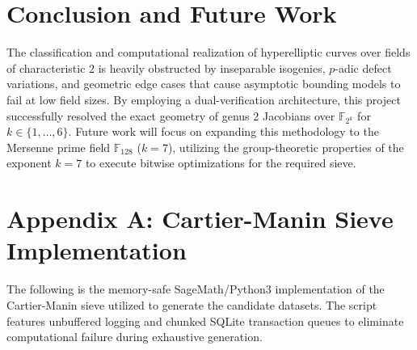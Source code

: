 \documentclass[12pt]{article}
\begin{document}
\section{Conclusion and Future Work}
The classification and computational realization of hyperelliptic curves over fields of characteristic 2 is heavily obstructed by inseparable isogenies, $p$-adic defect variations, and geometric edge cases that cause asymptotic bounding models to fail at low field sizes. By employing a dual-verification architecture, this project successfully resolved the exact geometry of genus 2 Jacobians over $\mathbb{F}_{2^k}$ for $k \in \{1, \dots, 6\}$. Future work will focus on expanding this methodology to the Mersenne prime field $\mathbb{F}_{128}$ ($k=7$), utilizing the group-theoretic properties of the exponent $k=7$ to execute bitwise optimizations for the required sieve.

\section*{Appendix A: Cartier-Manin Sieve Implementation}
The following is the memory-safe SageMath/Python3 implementation of the Cartier-Manin sieve utilized to generate the candidate datasets. The script features unbuffered logging and chunked SQLite transaction queues to eliminate computational failure during exhaustive generation.
\end{document}
